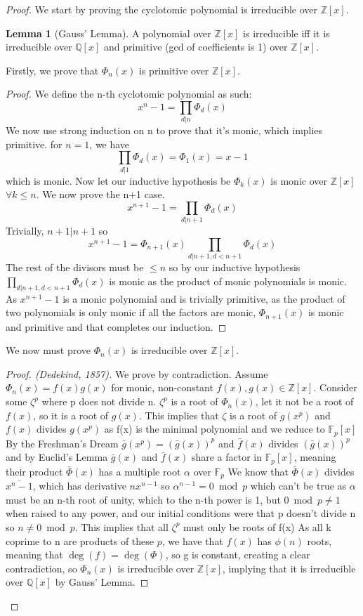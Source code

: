 \documentclass[12pt]{extarticle}
\theoremstyle{definition}
\newtheorem{lem}[thm]{Lemma}
\begin{document}
\begin{proof}
We start by proving the cyclotomic polynomial is irreducible over $\mathbb{Z}[x]$.
\begin{lem}[Gauss' Lemma]
A polynomial over $\mathbb{Z}[x]$ is irreducible iff it is irreducible over $\mathbb{Q}[x]$ and primitive (gcd of coefficients is 1) over $\mathbb{Z}[x]$.
\end{lem}
Firstly, we prove that $\Phi_n(x)$ is primitive over $\mathbb{Z}[x]$.
\begin{proof}
We define the n-th cyclotomic polynomial as such: $$x^n-1 = \prod\limits_{d |n} \Phi_d(x)$$ We now use strong induction on n to prove that it's monic, which implies primitive. for $n = 1$, we have $$ \prod\limits_{d |1} \Phi_d(x) = \Phi_1(x)= x-1$$ which is monic. Now let our inductive hypothesis be $\Phi_k(x)$ is monic over $\mathbb{Z}[x]$ $\forall k \le n$. We now prove the n+1 case. $$x^{n+1}-1 = \prod\limits_{d | n+1} \Phi_d(x)$$ Trivially, $n+1 | n+1$ so $$x^{n+1}-1 = \Phi_{n+1}(x)\prod\limits_{d | n+1, d\lt n+1} \Phi_d(x)$$ The rest of the divisors must be $\le n$ so by our inductive hypothesis $\prod\limits_{d | n+1, d\lt n+1} \Phi_d(x)$ is monic as the product of monic polynomials is monic. As $x^{n+1}-1$ is a monic polynomial and is trivially primitive, as the product of two polynomials is only monic if all the factors are monic, $\Phi_{n+1}(x)$ is monic and primitive and that completes our induction.
\end{proof}
We now must prove $\Phi_n(x)$ is irreducible over $\mathbb{Z}[x]$.
\begin{proof}[Proof. (Dedekind, 1857)]
We prove by contradiction. Assume $\Phi_n(x) = f(x)g(x)$ for monic, non-constant $f(x),g(x) \in  \mathbb{Z}[x]$. Consider some $\zeta^p$ where p does not divide n. $\zeta^p$ is a root of $\Phi_n(x)$, let it not be a root of $f(x)$, so it is a root of $g(x)$. This implies that $\zeta$ is a root of $g(x^p)$ and $f(x)$ divides $g(x^p)$ as f(x) is the minimal polynomial and we reduce to $\mathbb{F}_p[x]$ By the Freshman's Dream $\bar{g}(x^p) = (\bar{g}(x))^p$ and $\bar{f}(x)$ divides $(\bar{g}(x))^p$ and by Euclid's Lemma $\bar{g}(x)$ and $\bar{f}(x)$ share a factor in $\mathbb{F}_p[x]$, meaning their product $\bar{\Phi}(x)$ has a multiple root $\alpha$ over $\mathbb{F}_p$ We know that $\bar{\Phi}(x)$ divides $\overline{x^n-1}$, which has derivative $nx^{n-1}$ so $\alpha^{n-1} = 0 \bmod{p}$ which can't be true as $\alpha$ must be an n-th root of unity, which to the n-th power is 1, but $0\bmod p \neq 1$ when raised to any power, and our initial conditions were that p doesn't divide n so $n \neq 0 \bmod p$. This implies that all $\zeta^p$ must only be roots of f(x) As all k coprime to n are products of these $p$, we have that $f(x)$ has $\phi(n)$ roots, meaning that $\deg(f) = \deg(\Phi)$, so g is constant, creating a clear contradiction, so $\Phi_n(x)$ is irreducible over $\mathbb{Z}[x]$, implying that it is irreducible over $\mathbb{Q}[x]$ by Gauss' Lemma.

\end{proof}
\end{proof}
\end{document}
